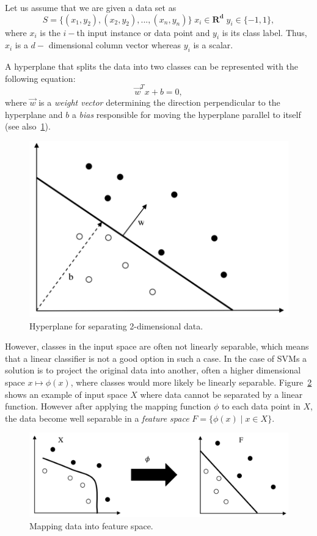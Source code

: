 Let us assume that we are given a data set as
\[  S = \{(x_1,y_2), (x_2,y_2), ...,(x_n,y_n) \} \; x_i \in \mathbf{R^d} \; y_i \in \{-1,1\}, \]
where \( x_i\) is the \( i-\)th input instance or data point and \( y_i\) is its class label. Thus, \(x_i\) is a \(d-\) dimensional column vector whereas \( y_i\) is a scalar.

A hyperplane that splits the data into two classes can be represented with the following equation:
\[\vec{w}^Tx + b = 0, \] 
where \(\vec{w}\) is a \textit{weight vector} determining the direction perpendicular to the hyperplane and \(b\) a \textit{bias} responsible for moving the hyperplane parallel to itself (see also~\ref{fig:hyperplane1}).

\begin{figure}[h!]
    \centering %
    \includegraphics[scale=0.6]{Graphics/svm1.png}
    \caption{Hyperplane for separating 2-dimensional data.}
    \label{fig:hyperplane1}
\end{figure}

However, classes in the input space are often not linearly separable, which means that a linear classifier is not a good option in such a case. In the case of SVMs a solution is to project the original data into another, often a higher dimensional space \(x \mapsto \phi(x) \), where classes would more likely be linearly separable. Figure~\ref{fig:hyperplane2} shows an example of input space \(X\) where data cannot be separated by a linear function. However after applying the mapping function \(\phi\) to each data point in \(X\), the data become well separable in a \textit{feature space} \(F = \{ \phi(x)\; | \; x \in X\}\).
\begin{figure}[h!]
    \centering
    \includegraphics[scale=0.6]{Graphics/svp-separation.png}
    \caption{Mapping data into feature space.}
    \label{fig:hyperplane2}
\end{figure}

